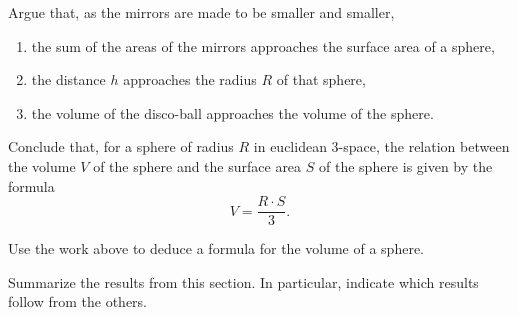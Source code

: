 \documentclass[newpage,hints,handout]{ximera}
\begin{document}
\begin{problem}
Argue that, as the mirrors are made to be smaller and smaller,
\begin{enumerate}
\item the sum of the areas of the mirrors approaches the surface area of a sphere,
\item the distance $h$ approaches the radius $R$ of that sphere,
\item the volume of the disco-ball approaches the volume of the sphere.
\end{enumerate}
Conclude that, for a sphere of radius $R$ in euclidean $3$-space, the relation
between the volume $V$ of the sphere and the surface area $S$ of the sphere is
given by the formula%
\[
V=\frac{R\cdot S}{3}.
\]
\end{problem}

\begin{problem}
Use the work above to deduce a formula for the volume of a sphere.
\end{problem}




\begin{problem}
Summarize the results from this section. In particular, indicate which
results follow from the others.
\begin{freeResponse}
\end{freeResponse}
\end{problem}
\end{document}
